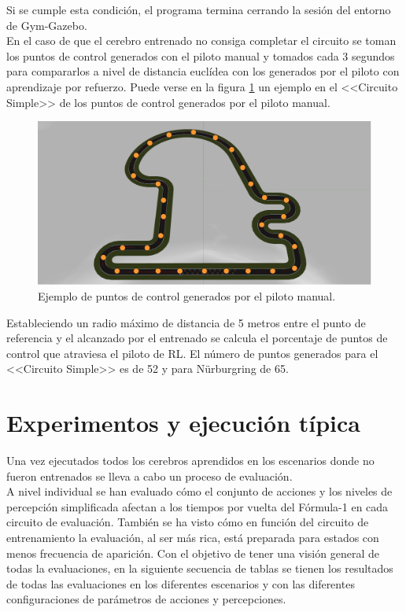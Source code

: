 \vspace{5mm}\textbf{}

Si se cumple esta condición, el programa termina cerrando la sesión del entorno de Gym-Gazebo.\\

En el caso de que el cerebro entrenado no consiga completar el circuito se toman los puntos de control generados con el piloto manual y tomados cada 3 segundos para compararlos a nivel de distancia euclídea con los generados por el piloto con aprendizaje por refuerzo. Puede verse en la figura \ref{fig:punto_control} un ejemplo en el <<Circuito Simple>> de los puntos de control generados por el piloto manual.

\begin{figure}[ht!]
    \centering \includegraphics[width=0.5\columnwidth]{./figures/chapter_5/balizas_simple.png}
    \caption{Ejemplo de puntos de control generados por el piloto manual.}\label{fig:punto_control}
\end{figure}

Estableciendo un radio máximo de distancia de 5 metros entre el punto de referencia y el alcanzado por el entrenado se calcula el porcentaje de puntos de control que atraviesa el piloto de RL. El número de puntos generados para el <<Circuito Simple>> es de 52 y para Nürburgring de 65.


\section{Experimentos y ejecución típica}

Una vez ejecutados todos los cerebros aprendidos en los escenarios donde no fueron entrenados se lleva a cabo un proceso de evaluación.\\

A nivel individual se han evaluado cómo el conjunto de acciones y los niveles de percepción simplificada  afectan a los tiempos por vuelta del Fórmula-1 en cada circuito de evaluación. También se ha visto cómo en función del circuito de entrenamiento la evaluación, al ser más rica, está preparada para estados con menos frecuencia de aparición. Con el objetivo de tener una visión general de todas la evaluaciones, en la siguiente secuencia de tablas se tienen los resultados de todas las evaluaciones en los diferentes escenarios y con las diferentes configuraciones de parámetros de acciones y percepciones.\\

